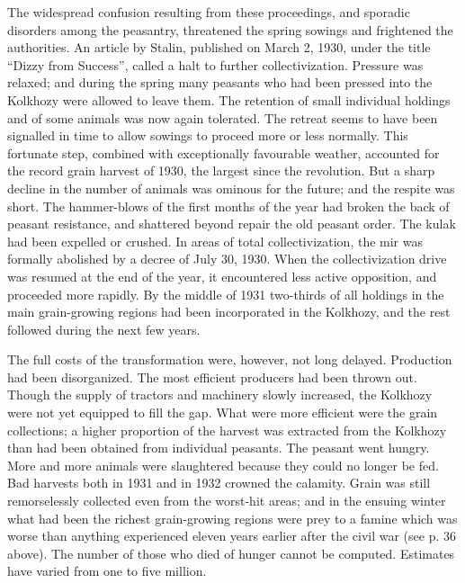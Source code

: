 The widespread confusion resulting from these proceedings, and sporadic disorders among the peasantry, threatened the spring sowings and frightened the authorities. An article by Stalin, published on March 2, 1930, under the title ``Dizzy from Success'', called a halt to further collectivization. Pressure was relaxed; and during the spring many peasants who had been pressed into the Kolkhozy were allowed to leave them. The retention of small individual holdings and of some animals was now again tolerated. The retreat seems to have been signalled in time to allow sowings to proceed more or less normally. This fortunate step, combined with exceptionally favourable weather, accounted for the record grain harvest of 1930, the largest since the revolution. But a sharp decline in the number of animals was ominous for the future; and the respite was short. The hammer-blows of the first months of the year had broken the back of peasant resistance, and shattered beyond repair the old peasant order. The kulak had been expelled or crushed. In areas of total collectivization, the mir was formally abolished by a decree of July 30, 1930. When the collectivization drive was resumed at the end of the year, it encountered less active opposition, and proceeded more rapidly. By the middle of 1931 two-thirds of all holdings in the main grain-growing regions had been incorporated in the Kolkhozy, and the rest followed during the next few years. 

The full costs of the transformation were, however, not long delayed. Production had been disorganized. The most efficient producers had been thrown out. Though the supply of tractors and machinery slowly increased, the Kolkhozy were not yet equipped to fill the gap. What were more efficient were the grain collections; a higher proportion of the harvest was extracted from the Kolkhozy than had been obtained from individual peasants. The peasant went hungry. More and more animals were slaughtered because they could no longer be fed. Bad harvests both in 1931 and in 1932 crowned the calamity. Grain was still remorselessly collected even from the worst-hit areas; and in the ensuing winter what had been the richest grain-growing regions were prey to a famine which was worse than anything experienced eleven years earlier after the civil war (see p. 36 above). The number of those who died of hunger cannot be computed. Estimates have varied from one to five million. 

